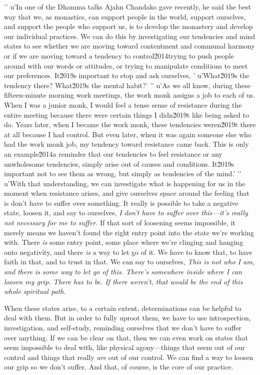 '\n'
u'In one of the Dhamma talks Ajahn Chandako gave recently, he said the best way that we, as monastics, can support people in the world, support ourselves, and support the people who support us, is to develop the monastery and develop our individual practices. We can do this by investigating our tendencies and mind states to see whether we are moving toward contentment and communal harmony or if we are moving toward a tendency to control\u2014trying to push people around with our words or attitudes, or trying to manipulate conditions to meet our preferences. It\u2019s important to stop and ask ourselves, '
u'What\u2019s the tendency there? What\u2019s the mental habit?'
'\n'
u'As we all know, during these fifteen-minute morning work meetings, the work monk assigns a job to each of us. When I was a junior monk, I would feel a tense sense of resistance during the entire meeting because there were certain things I didn\u2019t like being asked to do. Years later, when I became the work monk, these tendencies weren\u2019t there at all because I had control. But even later, when it was again someone else who had the work monk job, my tendency toward resistance came back. This is only an example\u2014a reminder that our tendencies to feel resistance or any unwholesome tendencies, simply arise out of causes and conditions. It\u2019s important not to see them as wrong, but simply as tendencies of the mind.'
'\n'
u'With that understanding, we can investigate what is happening for us in the moment when resistance arises, and give ourselves space around the feeling that is don't have to suffer over something. It 
really is possible to take a negative state, loosen it, and say to 
ourselves, \emph{I don't have to suffer over this---it's really not 
necessary for me to suffer.} If that sort of loosening seems 
impossible, it merely means we haven't found the right entry point into 
the state we're working with. There \emph{is} some entry point, some 
place where we're clinging and hanging onto negativity, and there 
\emph{is} a way to let go of it. We have to know that, to have faith in 
that, and to trust in that. We can say to ourselves, \emph{This is not 
who I am, and there is some way to let go of this. There's somewhere 
inside where I can loosen my grip. There has to be. If there weren't, 
that would be the end of this whole spiritual path.}

When these states arise, to a certain extent, determinations can be 
helpful to deal with them. But in order to fully uproot them, we have 
to use introspection, investigation, and self-study, reminding 
ourselves that we don't have to suffer over anything. If we can be 
clear on that, then we can even work on states that seem impossible to 
deal with, like physical agony---things that seem out of our control 
and things that really \emph{are} out of our control. We can find a way 
to loosen our grip so we don't suffer. And that, of course, is the core 
of our practice.

